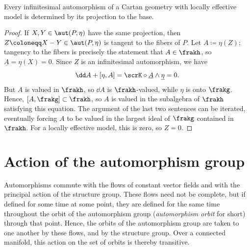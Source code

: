 \begin{prop}
    Every infinitesimal automorphism of a Cartan geometry with locally effective model is determined by its projection to the base.
\end{prop}
\begin{proof}
    If $X,Y\in\aut(P,\eta)$ have the same projection, then $Z\coloneqq X-Y\in\aut(P,\eta)$ is tangent to the fibers of $P$. Let $A\coloneqq \eta(Z)$; tangency to the fibers is precisely the statement that $A\in \frakh$, so $\underline{A}=\underline{\eta}(X)=0$. Since $Z$ is an infinitesimal automorphism, we have 
    \[\dd A+[\eta,A]=\scrK\circ \underline{A}\wedge \underline{\eta}=0.\]
    But $A$ is valued in $\frakh$, so $\dd A$ is $\frakh$-valued, while $\eta$ is onto $\frakg$. Hence, $[A,\frakg]\subset \frakh$, so $A$ is valued in the subalgebra of $\frakh$ satisfying this equation. The argument of the last two sentences can be iterated, eventually forcing $A$ to be valued in the largest ideal of $\frakg$ contained in $\frakh$. For a locally effective model, this is zero, so $Z=0$.
\end{proof}






\section{Action of the automorphism group}

Automorphisms commute with the flows of constant vector fields and with the principal action of the structure group. These flows need not be complete, but if defined for some time at some point, they are defined for the same time throughout the orbit of the automorphism group (\emph{automorphism orbit} for short) through that point. Hence, the orbits of the automorphism group are taken to one another by these flows, and by the structure group. Over a connected manifold, this action on the set of orbits is thereby transitive.

